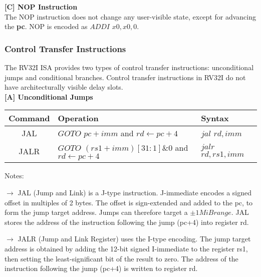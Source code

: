 	\textbf{ {\footnotesize[C] NOP Instruction }} \\
	
	The NOP instruction does not change any user-visible state, except for advancing the \textbf{pc}. NOP is encoded as $ADDI$ $x0,x0,0$. 
	\vspace{5mm}
	
	\subsubsection{Control Transfer Instructions}
	\label{subsubsec:ControlTransferInstr}
	
	The RV32I ISA provides two types of control transfer instructions: unconditional jumps and conditional branches. Control transfer instructions in RV32I do not have architecturally visible delay slots.\\
	
	\textbf{ {\footnotesize[A] Unconditional Jumps }} \\
	
	\begin{threeparttable}
		\begin{tabular}{|c|p{3in}|p{1in}|} \hline
			\setrow{\bfseries}Command &\setrow{\bfseries} Operation &\setrow{\bfseries} Syntax 	\\\hline
			\cellcolor{carorange}JAL & {\footnotesize $GOTO$ $pc+imm$ and $rd\leftarrow pc+4$} & $jal$ $rd,imm$ \\\hline
			\cellcolor{brightgreen}JALR & {\footnotesize $GOTO$ $(rs1+imm)[31:1]\&0$ and $rd\leftarrow pc+4$} & {\small$jalr$ $rd,rs1,imm$}\\\hline 
		\end{tabular}
		\begin{tablenotes}
		\footnotesize	
		\item 
		Notes:
		\item 
		\underline{\textbf{\textcolor{carorange}{$\rightarrow$}}} JAL (Jump and Link) is a J-type instruction. J-immediate encodes a signed offset in multiples of 2 bytes. The offset is sign-extended and added to the pc, to form the jump target address. Jumps can therefore target a $\pm1MiB range$. JAL stores the address of the instruction following the jump (pc+4) into register rd.
		\item 
		\underline{\textbf{\textcolor{brightgreen}{$\rightarrow$}}} JALR (Jump and Link Register) uses the I-type encoding. The jump target address is obtained by adding the 12-bit signed I-immediate to the register rs1, then setting the least-significant bit of the result to zero. The address of the instruction following the jump (pc+4) is written to register rd.
		\end{tablenotes}
		\label{subsubsec:table2.4}
		\vspace{1cm}
	\end{threeparttable}

